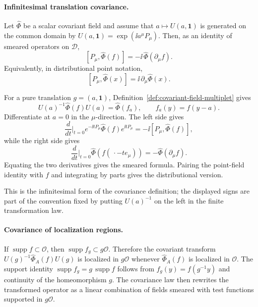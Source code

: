 \paragraph{Infinitesimal translation covariance.}
Let \(\widehat\Phi\) be a scalar covariant field and assume that
\(a\mapsto U(a,\mathbf 1)\) is generated on the common domain by
\(U(a,\mathbf 1)=\exp(\ii a^\mu P_\mu)\). Then, as an identity of smeared
operators on \(\mathcal D\),
\[
  [P_\mu,\widehat\Phi(f)]
  =
  -\ii\,\widehat\Phi(\partial_\mu f).
\]
Equivalently, in distributional point notation,
\[
  [P_\mu,\widehat\Phi(x)]
  =
  \ii\,\partial_\mu\widehat\Phi(x).
\]

For a pure translation \(g=(a,\mathbf 1)\),
Definition~\ref{def:covariant-field-multiplet} gives
\[
  U(a)^{-1}\widehat\Phi(f)U(a)
  =
  \widehat\Phi(f_a),
  \qquad
  f_a(y)=f(y-a).
\]
Differentiate at \(a=0\) in the \(\mu\)-direction. The left side gives
\[
  \frac{d}{dt}\Big|_{t=0}
  e^{-\ii tP_\mu}\widehat\Phi(f)e^{\ii tP_\mu}
  =
  -\ii[P_\mu,\widehat\Phi(f)],
\]
while the right side gives
\[
  \frac{d}{dt}\Big|_{t=0}\widehat\Phi(f(\,\cdot-te_\mu))
  =
  -\widehat\Phi(\partial_\mu f).
\]
Equating the two derivatives gives the smeared formula. Pairing the
point-field identity with \(f\) and integrating by parts gives the
distributional version.

This is the infinitesimal form of the covariance definition; the displayed
signs are part of the convention fixed by putting \(U(a)^{-1}\) on the left in
the finite transformation law.

\paragraph{Covariance of localization regions.}
If \(\operatorname{supp}f\subset\mathcal O\), then
\(\operatorname{supp}f_g\subset g\mathcal O\). Therefore the covariant
transform \(U(g)^{-1}\widehat\Phi_A(f)U(g)\) is localized in \(g\mathcal O\)
whenever \(\widehat\Phi_A(f)\) is localized in \(\mathcal O\).
The support identity \(\operatorname{supp}f_g=g\,\operatorname{supp}f\)
follows from \(f_g(y)=f(g^{-1}y)\) and continuity of the homeomorphism \(g\).
The covariance law then rewrites the transformed operator as a linear
combination of fields smeared with test functions supported in
\(g\mathcal O\).

